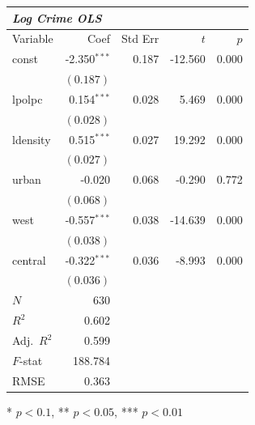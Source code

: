 \renewcommand{\arraystretch}{1.1}
\setlength{\tabcolsep}{6pt}
\begin{table}[H]
\centering
\begin{tabular}{lrrrr}
\hline
\multicolumn{5}{l}{\textit{Log Crime OLS}} \\
\hline
Variable & Coef & Std Err & $t$ & $p$ \\
\hline
const & -2.350$^{\ast\ast\ast}$ & 0.187 & -12.560 & 0.000 \\
 & $(0.187)$ & & & \\
lpolpc & 0.154$^{\ast\ast\ast}$ & 0.028 & 5.469 & 0.000 \\
 & $(0.028)$ & & & \\
ldensity & 0.515$^{\ast\ast\ast}$ & 0.027 & 19.292 & 0.000 \\
 & $(0.027)$ & & & \\
urban & -0.020 & 0.068 & -0.290 & 0.772 \\
 & $(0.068)$ & & & \\
west & -0.557$^{\ast\ast\ast}$ & 0.038 & -14.639 & 0.000 \\
 & $(0.038)$ & & & \\
central & -0.322$^{\ast\ast\ast}$ & 0.036 & -8.993 & 0.000 \\
 & $(0.036)$ & & & \\
\hline
$N$ & 630 & & & \\
$R^2$ & 0.602 & & & \\
Adj.\ $R^2$ & 0.599 & & & \\
$F$-stat & 188.784 & & & \\
RMSE & 0.363 & & & \\
\hline
\end{tabular}
\end{table}
\vspace{2pt}
\begin{flushleft}\footnotesize{* $p<0.1$, ** $p<0.05$, *** $p<0.01$}\end{flushleft}